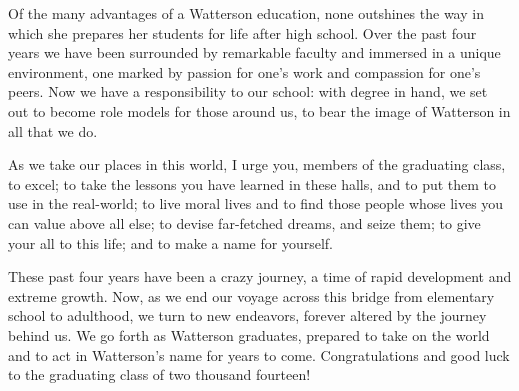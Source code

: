 \documentclass{report}
\begin{document}
Of the many advantages of a Watterson education, none outshines the way in
which she prepares her students for life after high school. Over the past four
years we have been surrounded by remarkable faculty and immersed in a unique
environment, one marked by passion for one's work and compassion for one's
peers. Now we have a responsibility to our school: with degree in hand, we set
out to become role models for those around us, to bear the image of Watterson
in all that we do.

As we take our places in this world, I urge you, members of the graduating
class, to excel; to take the lessons you have learned in these halls, and to
put them to use in the real-world; to live moral lives and to find those people
whose lives you can value above all else; to devise far-fetched dreams, and
seize them; to give your all to this life; and to make a name for yourself.

These past four years have been a crazy journey, a time of rapid development
and extreme growth. Now, as we end our voyage across this bridge from
elementary school to adulthood, we turn to new endeavors, forever altered by
the journey behind us. We go forth as Watterson graduates, prepared to take on
the world and to act in Watterson's name for years to come. Congratulations and
good luck to the graduating class of two thousand fourteen!
\end{document}
